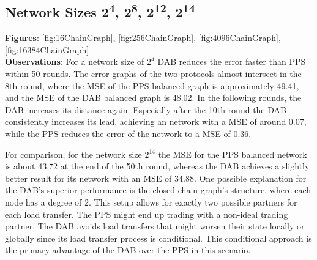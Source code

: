 \subsection{Network Sizes 2\textsuperscript{4}, 2\textsuperscript{8}, 2\textsuperscript{12}, 2\textsuperscript{14}}
\textbf{Figures}: \ref{fig:16ChainGraph}, \ref{fig:256ChainGraph}, \ref{fig:4096ChainGraph}, \ref{fig:16384ChainGraph}\\
\textbf{Observations}: For a network size of $2^{4}$ DAB reduces the error faster than PPS within 50 rounds. The error graphs of the two protocols almost intersect in the 8th round, where the MSE of the PPS balanced graph is approximately 49.41, and the MSE of the DAB balanced graph is 48.02. In the following rounds, the DAB increases its distance again. Especially after the 10th round the DAB consistently increases its lead, achieving an network with a MSE of around 0.07, while the PPS reduces the error of the network to a MSE of 0.36.

For comparison, for the network size $2^{14}$ the MSE for the PPS balanced network is about 43.72 at the end of the 50th round, whereas the DAB achieves a slightly better result for its network with an MSE of 34.88. One possible explanation for the DAB’s superior performance is the closed chain graph's structure, where each node has a degree of 2. This setup allows for exactly two possible partners for each load transfer. The PPS might end up trading with a non-ideal trading partner. The DAB avoids load transfers that might worsen their state locally or globally since its load transfer process is conditional. This conditional approach is the primary advantage of the DAB over the PPS in this scenario.

